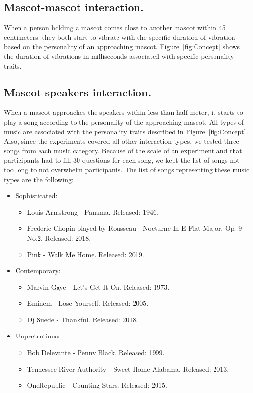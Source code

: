 \subsection*{Mascot-mascot interaction.}
When a person holding a mascot comes close to another mascot within 45 centimeters, they both start to vibrate with
the specific duration of vibration based on the personality of an approaching mascot.
Figure~\ref{fig:Concept} shows the duration of vibrations in milliseconds associated with
specific personality traits.

\subsection*{Mascot-speakers interaction.}
When a mascot approaches the speakers within less than half meter, it starts to play a song according
to the personality of the approaching mascot.
All types of music are associated with the personality traits described in Figure~\ref{fig:Concept}.
Also, since the experiments covered all other interaction types, we tested three songs from each music category.
Because of the scale of an experiment and that participants had to fill 30 questions for each song,
we kept the list of songs not too long to not overwhelm participants.
The list of songs representing these music types are the following:
\begin{itemize}
    \item Sophisticated:
    \begin{itemize}
        \item Louis Armstrong - Panama. Released: 1946.
        \item Frederic Chopin played by Rousseau - Nocturne In E Flat Major, Op. 9-No.2. Released: 2018.
        \item Pink - Walk Me Home. Released: 2019.
    \end{itemize}
    \item Contemporary:
    \begin{itemize}
        \item Marvin Gaye - Let's Get It On. Released: 1973.
        \item Eminem - Lose Yourself. Released: 2005.
        \item Dj Suede - Thankful. Released: 2018.
    \end{itemize}
    \item Unpretentious:
    \begin{itemize}
        \item Bob Delevante - Penny Black. Released: 1999.
        \item Tennessee River Authority - Sweet Home Alabama. Released: 2013.
        \item OneRepublic - Counting Stars. Released: 2015.
    \end{itemize}
\end{itemize}

